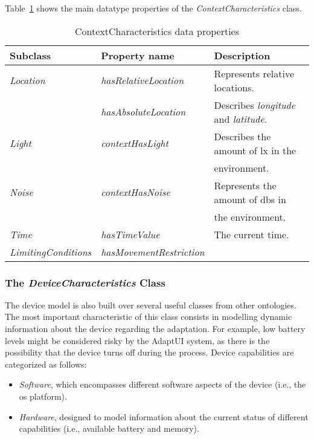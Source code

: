 Table~\ref{tbl:context_characteristics_ontology} shows the main datatype properties
of the \textit{ContextCharacteristics} class.

\begin{table}[H]
  \caption{ContextCharacteristics data properties}
 \label{tbl:context_characteristics_ontology}
\footnotesize
\centering
 \begin{tabular}{l l l}
  \hline 
  \textbf{Subclass} 	& \textbf{Property name} 	& \textbf{Description}					\\
  \hline
  \textit{Location}	& \textit{hasRelativeLocation}	& Represents relative locations.			\\
			& \textit{hasAbsoluteLocation}	& Describes \textit{longitude} and \textit{latitude}.	\\
  \textit{Light}	& \textit{contextHasLight}	& Describes the amount of \ac{lx} in the		\\
			& 				& environment.						\\
  \textit{Noise}	& \textit{contextHasNoise}	& Represents the amount of \acp{db} in 		\\
			& 				& the environment.					\\
  \textit{Time}		& \textit{hasTimeValue}		& The current time.					\\
  \textit{LimitingConditions}& \textit{hasMovementRestriction}&							\\
  \hline
  
\end{tabular}
\end{table}



\subsubsection{The \textit{DeviceCharacteristics} Class}
\label{sec:device_characteristics_class}

The device model is also built over several useful classes from other ontologies.
The most important characteristic of this class consists in modelling dynamic
information about the device regarding the adaptation. For example, low battery
levels might be considered risky by the AdaptUI system, as there is the possibility
that the device turns off during the process. Device capabilities are categorized
as follows:

\begin{itemize}
 \item \textit{Software}, which encompasses different software aspects of the
 device (i.e., the \ac{os} platform). 
 
 \item \textit{Hardware}, designed to model information about the current status
 of different capabilities (i.e., available battery and memory).
\end{itemize}


